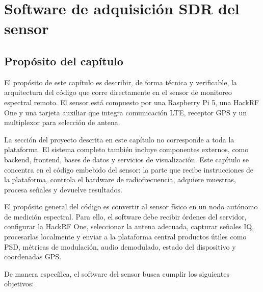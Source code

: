 \chapter{Software de adquisición SDR del sensor}

\section{Propósito del capítulo}

El propósito de este capítulo es describir, de forma técnica y verificable, la
arquitectura del código que corre directamente en el sensor de monitoreo espectral
remoto. El sensor está compuesto por una Raspberry Pi 5, una HackRF One y una
tarjeta auxiliar que integra comunicación LTE, receptor GPS y un multiplexor para
selección de antena.

La sección del proyecto descrita en este capítulo no corresponde a toda la
plataforma. El sistema completo también incluye componentes externos, como
backend, frontend, bases de datos y servicios de visualización. Este capítulo se
concentra en el código embebido del sensor: la parte que recibe instrucciones de
la plataforma, controla el hardware de radiofrecuencia, adquiere muestras,
procesa señales y devuelve resultados.

El propósito general del código es convertir al sensor físico en un nodo autónomo
de medición espectral. Para ello, el software debe recibir órdenes del servidor,
configurar la HackRF One, seleccionar la antena adecuada, capturar señales IQ,
procesarlas localmente y enviar a la plataforma central productos útiles como PSD,
métricas de modulación, audio demodulado, estado del dispositivo y coordenadas
GPS.

De manera específica, el software del sensor busca cumplir los siguientes
objetivos:

